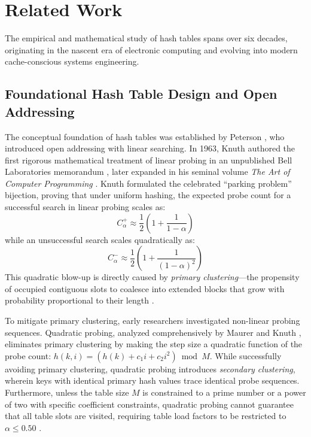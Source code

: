 \documentclass[conference]{IEEEtran}
\begin{document}
\section{Related Work}

The empirical and mathematical study of hash tables spans over six decades, originating in the nascent era of electronic computing and evolving into modern cache-conscious systems engineering.

\subsection{Foundational Hash Table Design and Open Addressing}

The conceptual foundation of hash tables was established by Peterson \cite{knuth1998}, who introduced open addressing with linear searching. In 1963, Knuth authored the first rigorous mathematical treatment of linear probing in an unpublished Bell Laboratories memorandum \cite{knuth1963}, later expanded in his seminal volume \emph{The Art of Computer Programming} \cite{knuth1998}. Knuth formulated the celebrated ``parking problem'' bijection, proving that under uniform hashing, the expected probe count for a successful search in linear probing scales as:
\begin{equation}
C^+_\alpha \approx \frac{1}{2}\left(1 + \frac{1}{1 - \alpha}\right)
\end{equation}
while an unsuccessful search scales quadratically as:
\begin{equation}
C^-_\alpha \approx \frac{1}{2}\left(1 + \frac{1}{(1 - \alpha)^2}\right)
\end{equation}
This quadratic blow-up is directly caused by \emph{primary clustering}---the propensity of occupied contiguous slots to coalesce into extended blocks that grow with probability proportional to their length \cite{sedgewick2011, clrs2022}.

To mitigate primary clustering, early researchers investigated non-linear probing sequences. Quadratic probing, analyzed comprehensively by Maurer and Knuth \cite{knuth1998}, eliminates primary clustering by making the step size a quadratic function of the probe count: $h(k, i) = (h(k) + c_1 i + c_2 i^2) \bmod M$. While successfully avoiding primary clustering, quadratic probing introduces \emph{secondary clustering}, wherein keys with identical primary hash values trace identical probe sequences. Furthermore, unless the table size $M$ is constrained to a prime number or a power of two with specific coefficient constraints, quadratic probing cannot guarantee that all table slots are visited, requiring table load factors to be restricted to $\alpha \le 0.50$ \cite{clrs2022}.
\end{document}

